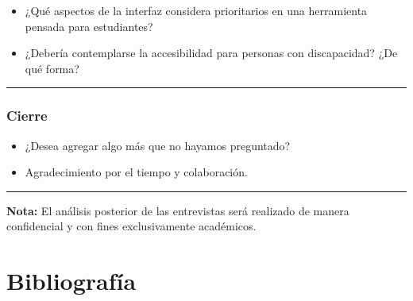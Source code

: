 \documentclass[12pt,oneside]{templates/unerthesis}
\providecommand{\tightlist}{%
  \setlength{\itemsep}{0pt}\setlength{\parskip}{0pt}}
\begin{document}
\begin{itemize}
\tightlist
\item
  ¿Qué aspectos de la interfaz considera prioritarios en una herramienta pensada para estudiantes?
\item
  ¿Debería contemplarse la accesibilidad para personas con discapacidad? ¿De qué forma?
\end{itemize}

\begin{center}\rule{0.5\linewidth}{0.5pt}\end{center}

\hypertarget{cierre}{%
\subsection{Cierre}\label{cierre}}

\begin{itemize}
\tightlist
\item
  ¿Desea agregar algo más que no hayamos preguntado?
\item
  Agradecimiento por el tiempo y colaboración.
\end{itemize}

\begin{center}\rule{0.5\linewidth}{0.5pt}\end{center}

\textbf{Nota:} El análisis posterior de las entrevistas será realizado de manera confidencial y con fines exclusivamente académicos.

\hypertarget{Biblio}{%
\chapter{Bibliografía}\label{Biblio}}
\end{document}
